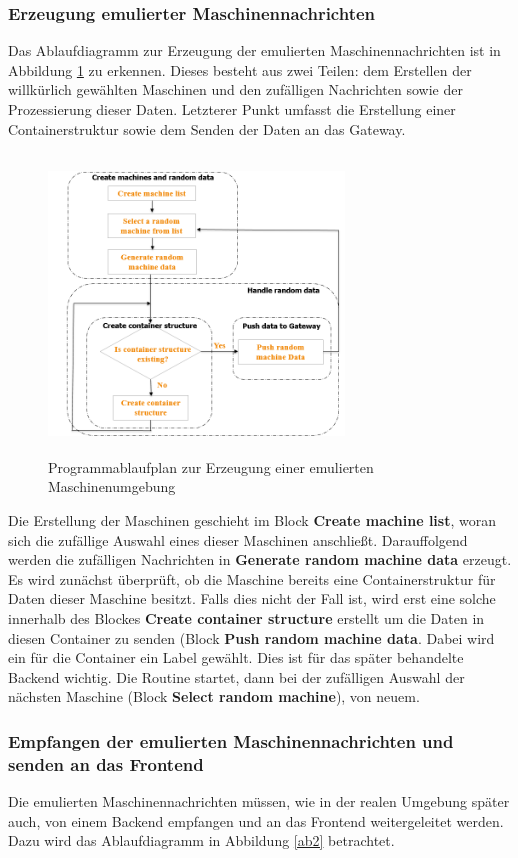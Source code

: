 \documentclass[
	12pt,								%
	DIV10,
	a4paper,         		%
	oneside,						%
	parskip=half,				%
	headings=normal,			%
	listof=totoc,					%
	bibliography=totoc,						%
	index=totoc,						%
	final								%
]{scrartcl}
\begin{document}
\subsubsection*{Erzeugung emulierter Maschinennachrichten}
Das Ablaufdiagramm zur Erzeugung der emulierten Maschinennachrichten ist in Abbildung \ref{ab1} zu erkennen. Dieses besteht aus zwei Teilen: dem Erstellen der willkürlich gewählten Maschinen und den zufälligen Nachrichten sowie der Prozessierung dieser Daten. Letzterer Punkt umfasst die Erstellung einer Containerstruktur sowie dem Senden der Daten an das Gateway. 
\begin{figure}[H]
\centering
\includegraphics[width=0.7\textwidth, height= 300px]{demo}
\caption{Programmablaufplan zur Erzeugung einer emulierten Maschinenumgebung}
\label{ab1}
\end{figure}
Die Erstellung der Maschinen geschieht im Block \textbf{Create machine list}, woran sich die zufällige Auswahl eines dieser Maschinen anschließt. Darauffolgend werden die zufälligen Nachrichten in \textbf{Generate random machine data} erzeugt. Es wird zunächst überprüft, ob die Maschine bereits eine Containerstruktur für Daten dieser Maschine besitzt. Falls dies nicht der Fall ist, wird erst eine solche innerhalb des Blockes \textbf{Create container structure} erstellt um die Daten in diesen Container zu senden (Block \textbf{Push random machine data}. Dabei wird ein für die Container ein Label gewählt. Dies ist für das später behandelte Backend wichtig. Die Routine startet, dann bei der zufälligen Auswahl der nächsten Maschine (Block \textbf{Select random machine}), von neuem.
\newpage
\subsubsection*{Empfangen der emulierten Maschinennachrichten und senden an das Frontend}
Die emulierten Maschinennachrichten müssen, wie in der realen Umgebung später auch, von einem Backend empfangen und an das Frontend weitergeleitet werden. Dazu wird das Ablaufdiagramm in Abbildung \ref{ab2} betrachtet.
\end{document}

